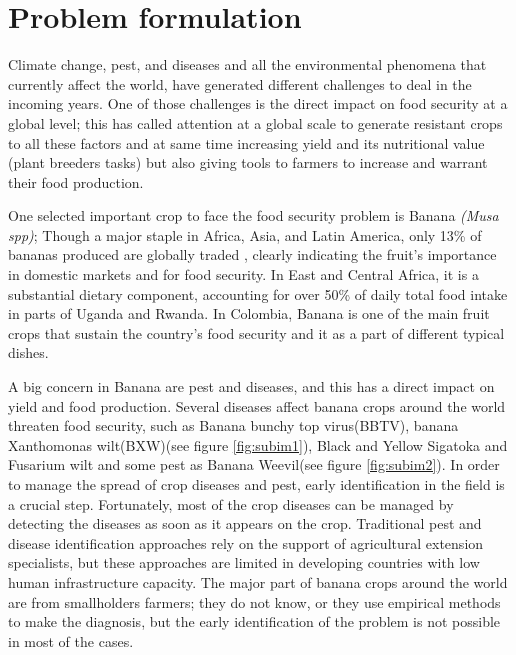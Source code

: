 
\chapter{Problem formulation} %
\label{Chapter2}

Climate change, pest, and diseases and all the environmental phenomena that currently affect the world, have generated different challenges to deal in the incoming years. One of those challenges is the direct impact on food security \cite{wheeler2013climate} at a global level; this has called attention at a global scale to generate  resistant crops to all these factors and at same time increasing yield and its nutritional value (plant breeders tasks) but also giving tools to farmers to increase and warrant their food production.

One selected important crop to face the food security problem is Banana \textit{(Musa spp)}\cite{faostat2014food};
Though a major staple in Africa, Asia, and Latin America, only 13\% of bananas produced are globally traded \cite{lescot2013world}, clearly indicating the fruit’s importance in domestic markets and for food security. In East and Central Africa, it is a substantial dietary component, accounting for over 50\% of daily total food intake in parts of Uganda and Rwanda\cite{abele2007bacterial}. In Colombia, Banana is one of the main fruit crops that sustain the country's food security and it as a part of different typical dishes.

A big concern in Banana are pest and diseases, and this has a direct impact on yield and food production. Several diseases affect banana crops around the world threaten food security, such as Banana bunchy top virus(BBTV), banana Xanthomonas wilt(BXW)(see figure \ref{fig:subim1}), Black and Yellow Sigatoka and Fusarium wilt and some pest as Banana Weevil(see figure \ref{fig:subim2}). In order to manage the spread of crop diseases and pest, early identification in the field is a crucial step. Fortunately, most of the crop diseases can be managed by detecting the diseases as soon as it appears on the crop. Traditional pest and disease identification approaches rely on the support of agricultural extension specialists, but these approaches are limited in developing countries with low human infrastructure capacity. The major part of banana crops around the world are from smallholders farmers; they do not know, or they use empirical methods to make the diagnosis, but the early identification of the problem is not possible in most of the cases. 



